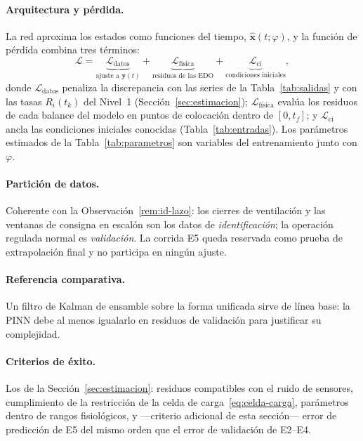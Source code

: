 \paragraph{Arquitectura y pérdida.} La red aproxima los estados como funciones
del tiempo, $\hat{\mathbf{x}}(t; \varphi)$, y la función de pérdida combina
tres términos:
\begin{equation}
  \mathcal{L} = \underbrace{\mathcal{L}_{\mathrm{datos}}}_{\text{ajuste a } \mathbf{y}(t)}
  + \underbrace{\mathcal{L}_{\mathrm{física}}}_{\text{residuos de las EDO}}
  + \underbrace{\mathcal{L}_{\mathrm{ci}}}_{\text{condiciones iniciales}},
  \label{eq:pinn-loss}
\end{equation}
donde $\mathcal{L}_{\mathrm{datos}}$ penaliza la discrepancia con las series
de la Tabla~\ref{tab:salidas} y con las tasas $R_i(t_k)$ del Nivel~1
(Sección~\ref{sec:estimacion}); $\mathcal{L}_{\mathrm{física}}$ evalúa los
residuos de cada balance del modelo en puntos de colocación dentro de
$[0, t_f]$; y $\mathcal{L}_{\mathrm{ci}}$ ancla las condiciones iniciales
conocidas (Tabla~\ref{tab:entradas}). Los parámetros estimados de la
Tabla~\ref{tab:parametros} son variables del entrenamiento junto con
$\varphi$.

\paragraph{Partición de datos.} Coherente con la
Observación~\ref{rem:id-lazo}: los cierres de ventilación y las ventanas de
consigna en escalón son los datos de \emph{identificación}; la operación
regulada normal es \emph{validación}. La corrida E5 queda reservada como
prueba de extrapolación final y no participa en ningún ajuste.

\paragraph{Referencia comparativa.} Un filtro de Kalman de ensamble sobre la
forma unificada sirve de línea base: la PINN debe al menos igualarlo en
residuos de validación para justificar su complejidad.

\paragraph{Criterios de éxito.} Los de la Sección~\ref{sec:estimacion}:
residuos compatibles con el ruido de sensores, cumplimiento de la
restricción de la celda de carga~\eqref{eq:celda-carga}, parámetros dentro
de rangos fisiológicos, y ---criterio adicional de esta sección--- error de
predicción de E5 del mismo orden que el error de validación de E2--E4.
